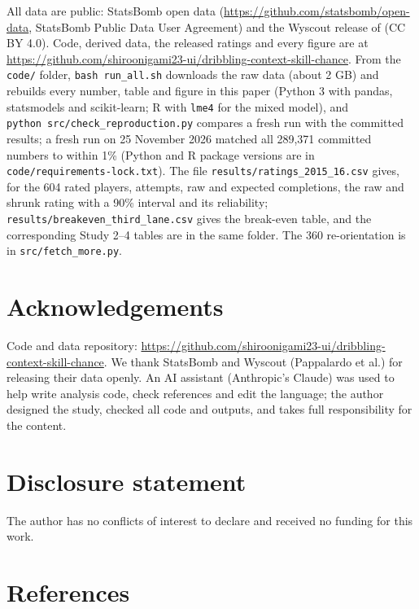 \documentclass[
  12pt]{article}
\begin{document}
All data are public: StatsBomb open data
(\url{https://github.com/statsbomb/open-data}, StatsBomb Public Data
User Agreement) and the Wyscout release of \citet{pappalardo2019data}
(CC BY 4.0). Code, derived data, the released ratings and every figure
are at
\url{https://github.com/shiroonigami23-ui/dribbling-context-skill-chance}.
From the \texttt{code/} folder, \texttt{bash\ run\_all.sh} downloads the
raw data (about 2 GB) and rebuilds every number, table and figure in
this paper (Python 3 with pandas, statsmodels and scikit-learn; R with
\texttt{lme4} for the mixed model), and
\texttt{python\ src/check\_reproduction.py} compares a fresh run with
the committed results; a fresh run on 25 November 2026 matched all
289,371 committed numbers to within 1\% (Python and R package versions
are in \texttt{code/requirements-lock.txt}). The file
\texttt{results/ratings\_2015\_16.csv} gives, for the 604 rated players,
attempts, raw and expected completions, the raw and shrunk rating with a
90\% interval and its reliability;
\texttt{results/breakeven\_third\_lane.csv} gives the break-even table,
and the corresponding Study 2--4 tables are in the same folder. The 360
re-orientation is in \texttt{src/fetch\_more.py}.

\section*{Acknowledgements}\label{acknowledgements}

Code and data repository:
\url{https://github.com/shiroonigami23-ui/dribbling-context-skill-chance}.
We thank StatsBomb and Wyscout (Pappalardo et al.) for releasing their
data openly. An AI assistant (Anthropic's Claude) was used to help write
analysis code, check references and edit the language; the author
designed the study, checked all code and outputs, and takes full
responsibility for the content.

\section*{Disclosure statement}\label{disclosure-statement}

The author has no conflicts of interest to declare and received no
funding for this work.

\section*{References}\label{references}
\end{document}
